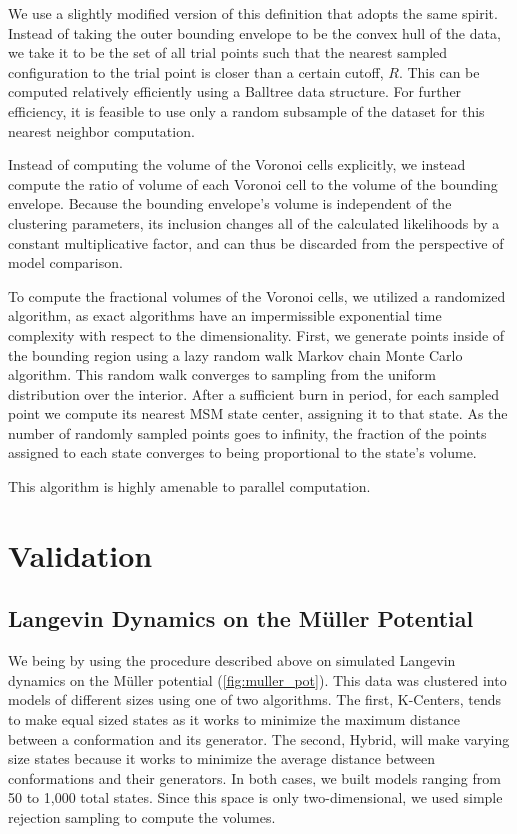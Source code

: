 \documentclass[twocolumn,floatfix,nofootinbib,aps]{revtex4-1}
\begin{document}
We use a slightly modified version of this definition that adopts
the same spirit. Instead of taking the outer bounding envelope to be the convex hull of the data, we take it to be the set of all trial points such that the nearest sampled configuration to the trial point is closer than a certain cutoff, $R$. This can be computed relatively efficiently using a Balltree data structure.\cite{Omohundro1989} For further efficiency, it is feasible to use only a random subsample of the dataset for this nearest neighbor computation.

Instead of computing the volume of the Voronoi cells explicitly, we instead
compute the ratio of volume of each Voronoi cell to the volume of the
bounding envelope. Because the bounding envelope's volume is independent of the clustering parameters, its inclusion changes all of the calculated likelihoods by a constant multiplicative factor, and can thus be discarded from the perspective of model comparison.

To compute the fractional volumes of the Voronoi cells, we utilized a randomized algorithm, as exact algorithms have an impermissible exponential time complexity with respect to the dimensionality. First, we generate points inside of the bounding region using a lazy random walk Markov chain Monte Carlo algorithm.\cite{Kannan97} This random walk converges to sampling from the uniform distribution over the interior. After a sufficient burn in period, for each sampled point we compute its nearest MSM state center, assigning it to that state. As the number of randomly sampled points goes to infinity, the fraction of the points assigned to each state converges to being proportional to the state's volume.

This algorithm is highly amenable to parallel computation.

\section{Validation}

\subsection{Langevin Dynamics on the M\"uller Potential}
We being by using the procedure described above on simulated Langevin dynamics on the M\"{u}ller potential (\cref{fig:muller_pot}). This data was clustered into models of different sizes using one of two algorithms. The first, K-Centers, tends to make equal sized states as it works to minimize the maximum distance between a conformation and its generator. The second, Hybrid, will make varying size states because it works to minimize the average distance between conformations and their generators. In both cases, we built models ranging from 50 to 1,000 total states. Since this space is only two-dimensional, we used simple rejection sampling to compute the volumes. 
\end{document}
